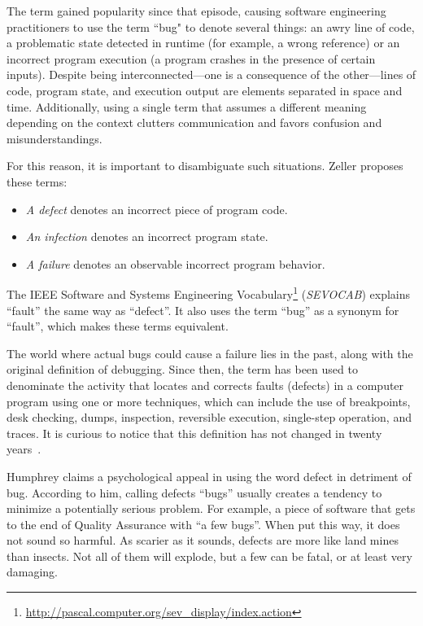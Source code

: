 The term gained popularity since that episode, causing software engineering
practitioners to use the term ``bug" to denote several things: an awry line of
code, a problematic state detected in runtime (for example, a wrong reference)
or an incorrect program execution (a program crashes in the presence of certain
inputs).
Despite being interconnected---one is a consequence of the other---lines of
code, program state, and execution output are elements separated in space and
time. Additionally, using a single term that assumes a different meaning
depending on the context clutters communication and favors confusion and
misunderstandings.

For this reason, it is important to disambiguate such situations.
Zeller \cite{zeller2009programs} proposes these terms:

\begin{itemize}
  \item \textit{A defect} denotes an incorrect piece of program code.
  \item \textit{An infection} denotes an incorrect program state.
  \item \textit{A failure} denotes an observable incorrect program behavior.
\end{itemize}

The IEEE Software and Systems Engineering
Vocabulary\footnote{\url{http://pascal.computer.org/sev_display/index.action}}
(\textit{SEVOCAB}) explains ``fault'' the same way as
``defect''\cite{zeller2009programs}. It also uses the term ``bug'' as a synonym
for ``fault'', which makes these terms equivalent.

The world where actual bugs could cause a failure lies in the past, along with
the original definition of debugging.
Since then, the term has been used to denominate the activity that locates and
corrects faults (defects) in a computer program using one or more techniques,
which can include the use of breakpoints, desk checking, dumps, inspection,
reversible execution, single-step operation, and traces. It is curious to notice
that this definition has not changed in twenty
years~\cite{ieee1990glossary,ieee2010vocabulary}.

Humphrey \cite{humphrey1999bugs} claims a psychological appeal in using the word
defect in detriment of bug. According to him, calling defects ``bugs'' usually
creates a tendency to minimize a potentially serious problem. For example, a
piece of software that gets to the end of Quality Assurance with ``a few bugs''.
When put this way, it does not sound so harmful. As scarier as it sounds,
defects are more like land mines than insects. Not all of them will explode, but
a few can be fatal, or at least very damaging.

